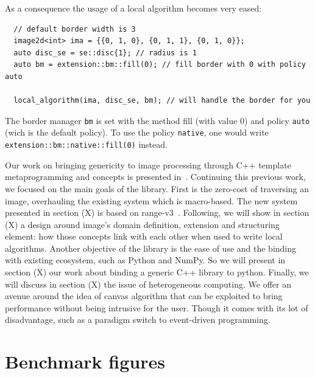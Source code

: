 As a consequence the usage of a local algorithm becomes very eased:

\begin{verbatim}
  // default border width is 3
  image2d<int> ima = {{0, 1, 0}, {0, 1, 1}, {0, 1, 0}};
  auto disc_se = se::disc{1}; // radius is 1
  auto bm = extension::bm::fill(0); // fill border with 0 with policy auto

  local_algorithm(ima, disc_se, bm); // will handle the border for you
\end{verbatim}

The border manager \texttt{bm} is set with the method fill (with value 0) and policy \texttt{auto} (wich is the default
policy). To use the policy \texttt{native}, one would write \texttt{extension::bm::native::fill(0)} instead.


Our work on bringing genericity to image processing through C++ template metaprogramming and concepts is presented
in~\parencite{roynard.2019.rrpr}. Continuing this previous work, we focused on the main goals of the library. First is the
zero-cost of traversing an image, overhauling the existing system which is macro-based. The new system presented in
section (X) is based on
range-v3~\cite{niebler.2014.ranges,niebler.2018.deepranges,niebler.2018.mergingranges}. Following, we will show in
section (X) a design around image's domain definition, extension and structuring element: how those
concepts link with each other when used to write local algorithms. Another objective of the library is the ease of use
and the binding with existing ecosystem, such as Python and NumPy. So we will present in
section (X) our work about binding a generic C++ library to python. Finally, we will
discuss in section (X) the issue of heterogeneous computing. We offer an avenue
around the idea of canvas algorithm that can be exploited to bring performance without being intrusive for the user.
Though it comes with its lot of disadvantage, such as a paradigm switch to event-driven programming.


\clearpage

\section{Benchmark figures}


